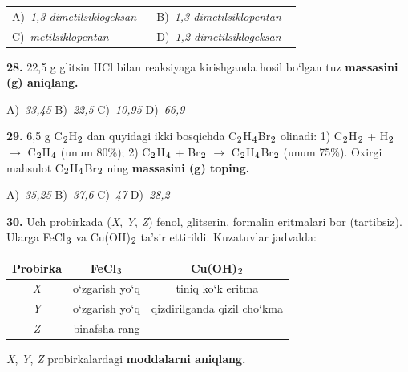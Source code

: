 \documentclass[11pt,a4paper]{article}
\renewcommand{\textsubscript}[1]{\ensuremath{_{\text{\fontsize{8}{8}\selectfont #1}}}}
\begin{document}
\begin{multicols}{2}
\noindent\begin{tabular}{@{}p{0.47\linewidth}@{}p{0.47\linewidth}@{}}
A)~\textsl{1,3-dimetilsiklogeksan} & B)~\textsl{1,3-dimetilsiklopentan} \\
C)~\textsl{metilsiklopentan} & D)~\textsl{1,2-dimetilsiklogeksan} \\
\end{tabular}\par
\vspace{4pt}
\noindent\textbf{28.} 22,5 g glitsin HCl bilan reaksiyaga kirishganda hosil bo`lgan tuz \textbf{massasini (g) aniqlang.}

\noindent A)~\textsl{33,45} \hfill B)~\textsl{22,5} \hfill C)~\textsl{10,95} \hfill D)~\textsl{66,9}\par
\vspace{4pt}
\noindent\textbf{29.} 6,5 g C\textsubscript{2}H\textsubscript{2} dan quyidagi ikki bosqichda C\textsubscript{2}H\textsubscript{4}Br\textsubscript{2} olinadi: 1) C\textsubscript{2}H\textsubscript{2} + H\textsubscript{2} $\to$ C\textsubscript{2}H\textsubscript{4} (unum 80\%); 2) C\textsubscript{2}H\textsubscript{4} + Br\textsubscript{2} $\to$ C\textsubscript{2}H\textsubscript{4}Br\textsubscript{2} (unum 75\%). Oxirgi mahsulot C\textsubscript{2}H\textsubscript{4}Br\textsubscript{2} ning \textbf{massasini (g) toping.}

\noindent A)~\textsl{35,25} \hfill B)~\textsl{37,6} \hfill C)~\textsl{47} \hfill D)~\textsl{28,2}\par
\vspace{4pt}
\end{multicols}
\noindent\textbf{30.} Uch probirkada (\textit{X}, \textit{Y}, \textit{Z}) fenol, glitserin, formalin eritmalari bor (tartibsiz). Ularga FeCl\textsubscript{3} va Cu(OH)\textsubscript{2} ta'sir ettirildi. Kuzatuvlar jadvalda:
\begin{center}
\renewcommand{\arraystretch}{1.15}
\begin{tabular}{|c|c|c|}\hline
\textbf{Probirka} & \textbf{FeCl\textsubscript{3}} & \textbf{Cu(OH)\textsubscript{2}} \\ \hline
\textit{X} & o`zgarish yo`q & tiniq ko`k eritma \\ \hline
\textit{Y} & o`zgarish yo`q & qizdirilganda qizil cho`kma \\ \hline
\textit{Z} & binafsha rang & --- \\ \hline
\end{tabular}
\end{center}
\textit{X}, \textit{Y}, \textit{Z} probirkalardagi \textbf{moddalarni aniqlang.}
\end{document}
